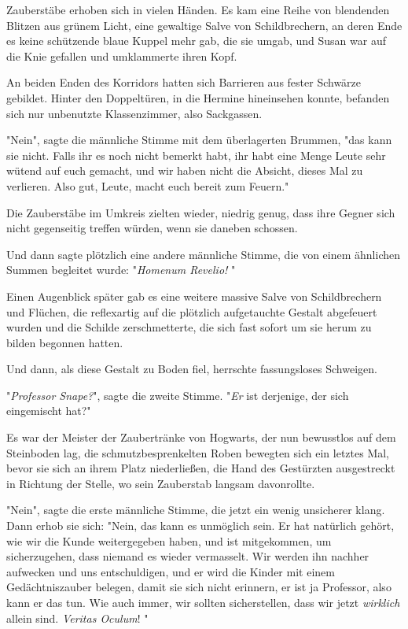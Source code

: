 {Zauberstäbe erhoben sich in vielen Händen. Es kam eine Reihe von blendenden Blitzen aus grünem Licht, eine gewaltige Salve von Schildbrechern, an deren Ende es keine schützende blaue Kuppel mehr gab, die sie umgab, und Susan war auf die Knie gefallen und umklammerte ihren Kopf.

An beiden Enden des Korridors hatten sich Barrieren aus fester Schwärze gebildet. Hinter den Doppeltüren, in die Hermine hineinsehen konnte, befanden sich nur unbenutzte Klassenzimmer, also Sackgassen.

"Nein", sagte die männliche Stimme mit dem überlagerten Brummen, "das kann sie nicht. Falls ihr es noch nicht bemerkt habt, ihr habt eine Menge Leute sehr wütend auf euch gemacht, und wir haben nicht die Absicht, dieses Mal zu verlieren. Also gut, Leute, macht euch bereit zum Feuern."

Die Zauberstäbe im Umkreis zielten wieder, niedrig genug, dass ihre Gegner sich nicht gegenseitig treffen würden, wenn sie daneben schossen.

Und dann sagte plötzlich eine andere männliche Stimme, die von einem ähnlichen Summen begleitet wurde: "\emph{Homenum Revelio!} "

Einen Augenblick später gab es eine weitere massive Salve von Schildbrechern und Flüchen, die reflexartig auf die plötzlich aufgetauchte Gestalt abgefeuert wurden und die Schilde zerschmetterte, die sich fast sofort um sie herum zu bilden begonnen hatten.

Und dann, als diese Gestalt zu Boden fiel, herrschte fassungsloses Schweigen.

"\emph{Professor Snape?}", sagte die zweite Stimme. "\emph{Er} ist derjenige, der sich eingemischt hat?"

Es war der Meister der Zaubertränke von Hogwarts, der nun bewusstlos auf dem Steinboden lag, die schmutzbesprenkelten Roben bewegten sich ein letztes Mal, bevor sie sich an ihrem Platz niederließen, die Hand des Gestürzten ausgestreckt in Richtung der Stelle, wo sein Zauberstab langsam davonrollte.

"Nein", sagte die erste männliche Stimme, die jetzt ein wenig unsicherer klang. Dann erhob sie sich: "Nein, das kann es unmöglich sein. Er hat natürlich gehört, wie wir die Kunde weitergegeben haben, und ist mitgekommen, um sicherzugehen, dass niemand es wieder vermasselt. Wir werden ihn nachher aufwecken und uns entschuldigen, und er wird die Kinder mit einem Gedächtniszauber belegen, damit sie sich nicht erinnern, er ist ja Professor, also kann er das tun. Wie auch immer, wir sollten sicherstellen, dass wir jetzt \emph{wirklich} allein sind. \emph{Veritas Oculum}! "

}
